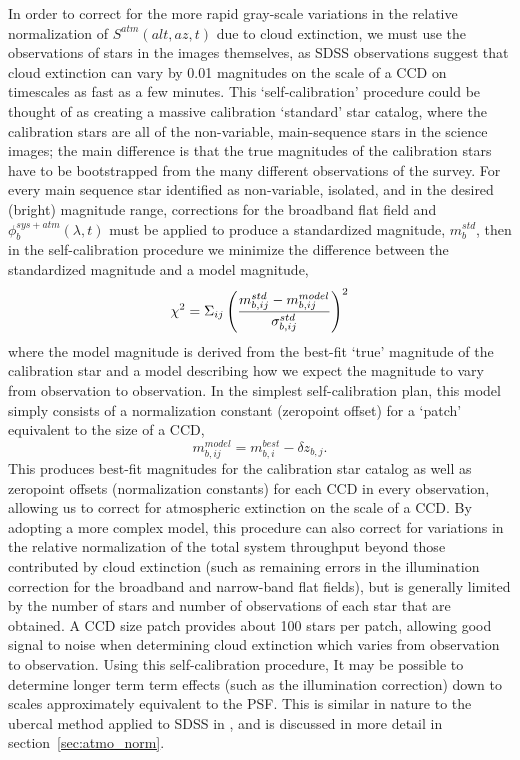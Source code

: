 \documentclass[12pt,preprint]{aastex}
\begin{document}
In order to correct for the more rapid gray-scale variations in the
relative normalization of $S^{atm}(alt,az,t)$ due to cloud extinction,
we must use the observations of stars in the images themselves, as
SDSS observations suggest that cloud extinction can vary by 0.01 magnitudes on the scale of a CCD
\citep{Ivezic2007} on timescales as fast as a few minutes. This
`self-calibration' procedure could be thought of as creating a massive
calibration `standard' star catalog, where the calibration stars are
all of the non-variable, main-sequence stars in the science images;
the main difference is that the true magnitudes of the calibration
stars have to be bootstrapped from the many different observations of
the survey. For every main sequence star identified as non-variable,
isolated, and in the desired (bright) magnitude range, corrections for
the broadband flat field and $\phi_b^{sys+atm}(\lambda,t)$ must be
applied to produce a standardized magnitude, $m_b^{std}$, then in the
self-calibration procedure we minimize the difference between the
standardized magnitude and a model magnitude,
\begin{equation}
\label{eqn:chi2}
\chi^2 = \Sigma_{ij} \left( { m_{b,ij}^{std} - m_{b,ij}^{model} \over
\sigma_{b,ij}^{std} } \right)^2
\end{equation}
where the model magnitude is derived from the best-fit `true'
magnitude of the calibration star and a model describing how we expect
the magnitude to vary from observation to observation. In the simplest
self-calibration plan, this model simply consists of a normalization constant
(zeropoint offset) for a `patch' equivalent to the size of a CCD,
\begin{equation}
\label{eqn:modelmag}
m_{b,ij}^{model} = m_{b,i}^{best} - \delta z_{b,j}.
\end{equation}
This produces best-fit magnitudes for the calibration star catalog as
well as zeropoint offsets (normalization constants) for each CCD in
every observation, allowing us to correct for atmospheric extinction
on the scale of a CCD. By adopting a more complex model, this
procedure can also correct for variations in the relative
normalization of the total system throughput beyond those contributed
by cloud extinction (such as remaining errors in the illumination
correction for the broadband and narrow-band flat fields), but is
generally limited by the number of stars and number of observations of
each star that are obtained. A CCD size patch provides about 100 stars
per patch, allowing good signal to noise when determining cloud
extinction which varies from observation to observation.  Using this
self-calibration procedure, It may be
possible to determine longer term term effects (such as the
illumination correction) down to scales approximately equivalent to
the PSF. This is similar in
nature to the ubercal method applied to SDSS in
\citet{Padmanabhan2008}, and is discussed in more detail in
section~\ref{sec:atmo_norm}.
\end{document}
